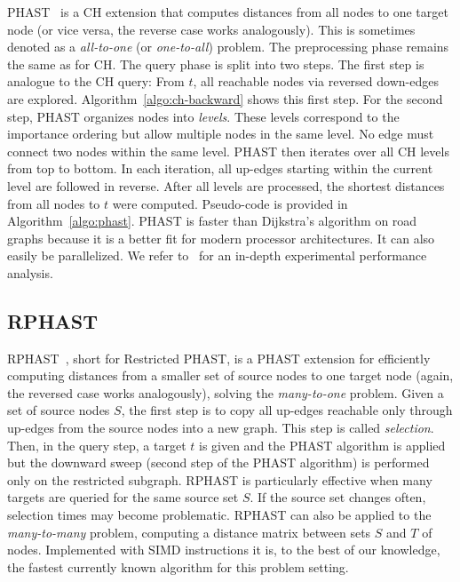 \documentclass[manuscript,review]{acmart}
\begin{document}
PHAST~\cite{dgnw-phast-13} is a CH extension that computes distances from all nodes to one target node (or vice versa, the reverse case works analogously).
This is sometimes denoted as a \emph{all-to-one} (or \emph{one-to-all}) problem.
The preprocessing phase remains the same as for CH.
The query phase is split into two steps.
The first step is analogue to the CH query:
From $t$, all reachable nodes via reversed down-edges are explored.
Algorithm~\ref{algo:ch-backward} shows this first step.
For the second step, PHAST organizes nodes into \emph{levels}.
These levels correspond to the importance ordering but allow multiple nodes in the same level.
No edge must connect two nodes within the same level.
PHAST then iterates over all CH levels from top to bottom.
In each iteration, all up-edges starting within the current level are followed in reverse.
After all levels are processed, the shortest distances from all nodes to $t$ were computed.
Pseudo-code is provided in Algorithm~\ref{algo:phast}.
PHAST is faster than Dijkstra's algorithm on road graphs because it is a better fit for modern processor architectures.
It can also easily be parallelized.
We refer to~\cite{dgnw-phast-13} for an in-depth experimental performance analysis.


\subsection{RPHAST}

RPHAST~\cite{delling_et_al:OASIcs:2011:3266}, short for Restricted PHAST, is a PHAST extension for efficiently computing distances from a smaller set of source nodes to one target node (again, the reversed case works analogously), solving the \emph{many-to-one} problem.
Given a set of source nodes $S$, the first step is to copy all up-edges reachable only through up-edges from the source nodes into a new graph.
This step is called \emph{selection}.
Then, in the query step, a target $t$ is given and the PHAST algorithm is applied but the downward sweep (second step of the PHAST algorithm) is performed only on the restricted subgraph.
RPHAST is particularly effective when many targets are queried for the same source set $S$.
If the source set changes often, selection times may become problematic.
RPHAST can also be applied to the \emph{many-to-many} problem, computing a distance matrix between sets $S$ and $T$ of nodes.
Implemented with SIMD instructions it is, to the best of our knowledge, the fastest currently known algorithm for this problem setting.
\end{document}
